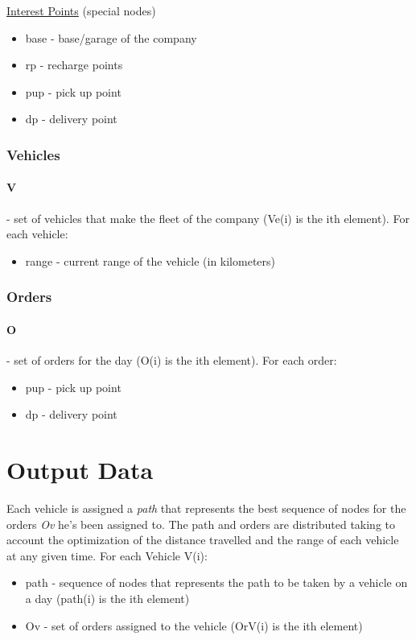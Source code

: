 \uline{Interest Points} (special nodes)
\begin{itemize}
	\item base - base/garage of the company
	\item rp - recharge points
	\item pup - pick up point
	\item dp - delivery point
\end{itemize}

\subsubsection{Vehicles}
\paragraph{V} - set of vehicles that make the fleet of the company (Ve(i) is the ith element). For each vehicle:
\begin{itemize}
	\item range - current range of the vehicle (in kilometers)
\end{itemize}

\subsubsection{Orders}
\paragraph{O} - set of orders for the day (O(i) is the ith element). For each order:
\begin{itemize}
    \item pup - pick up point
	\item dp - delivery point
\end{itemize}


\section{Output Data}
Each vehicle is assigned a \textit{path} that represents the best sequence of nodes for the orders \textit{Ov} he's been assigned to. The path and orders are distributed taking to account the optimization of the distance travelled and the range of each vehicle at any given time.
For each Vehicle V(i):
\begin{itemize}
	\item path - sequence of nodes that represents the path to be taken by a vehicle on a day (path(i) is the ith element)
	\item Ov - set of orders assigned to the vehicle (OrV(i) is the ith element)
\end{itemize}


